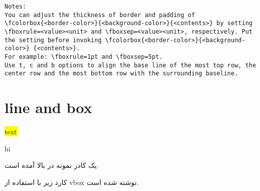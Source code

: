\documentclass[12pt]{article}
\begin{document}
\begin{latin}	
\begin{Verbatim}[breaklines=true, breakanywhere=true]
Notes:
You can adjust the thickness of border and padding of
\fcolorbox{<border-color>}{<background-color>}{<contents>} by setting \fboxrule=<value><unit> and \fboxsep=<value><unit>, respectively. Put the setting before invoking \fcolorbox{<border-color>}{<background-color>} {<contents>}. 
For example: \fboxrule=1pt and \fboxsep=5pt.
Use t, c and b options to align the base line of the most top row, the center row and the most bottom row with the surrounding baseline.
\end{Verbatim}
\end{latin}


\section{line and box}
\hlineshort



\colorbox{yellow}{text}

{\color{red}
}

hi


یک کادر نمونه در بالا آمده است.

کارد زیر با استفاده از vbox نوشته شده است.

\textbox[green]{\vbox{\noindent\ptext[1]}}


\hlinelong
\theend
\end{document}
